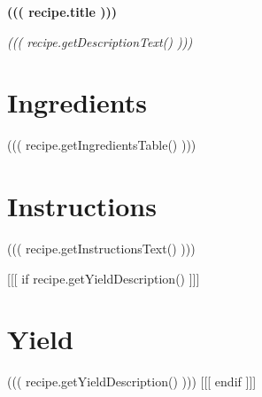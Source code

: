

    \begin{center}
        {\Large \textbf{((( recipe.title )))}}
        
        \small\emph{((( recipe.getDescriptionText() )))}
    \end{center}
    
    \section*{Ingredients}
    \begin{center}
        ((( recipe.getIngredientsTable() )))
    \end{center}
    
    \section*{Instructions}
    ((( recipe.getInstructionsText() )))
    
    [[[ if recipe.getYieldDescription() ]]]
        \section*{Yield}
        ((( recipe.getYieldDescription() )))
    [[[ endif ]]]


